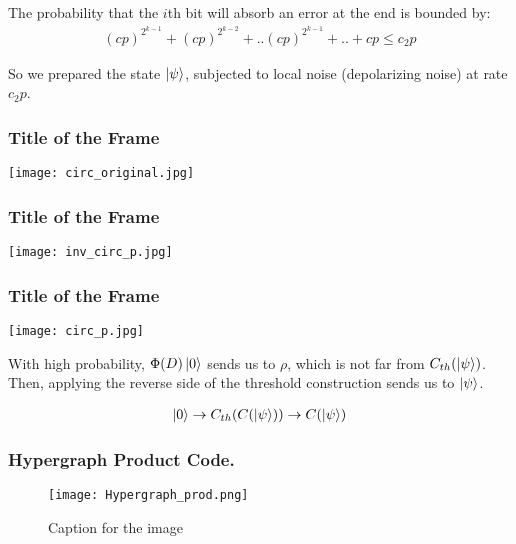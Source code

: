 \documentclass{beamer}
\begin{document}
\begin{frame}
The probability that the $i$th bit will absorb an error at the end is bounded by:
  \begin{equation*}
    \begin{split}
      \left( cp \right)^{2^{k-1}} + \left( cp \right)^{2^{k-2}} + .. \left( cp \right)^{2^{k-1}} + .. +  cp \le c_{2}p 
    \end{split}
  \end{equation*}
\end{frame}
So we prepared the state $\ket{\psi}$, subjected to local noise (depolarizing noise) at rate $c_{2}p$.

\begin{frame}
  \frametitle{Title of the Frame}
  \begin{center}
    \texttt{[image: circ\_original.jpg]}
  \end{center}
\end{frame}

\begin{frame}
  \frametitle{Title of the Frame}
  \begin{center}
    \texttt{[image: inv\_circ\_p.jpg]}
  \end{center}
\end{frame}

\begin{frame}
  \frametitle{Title of the Frame}
  \begin{center}
    \texttt{[image: circ\_p.jpg]}
  \end{center}
\end{frame}

\begin{frame}
With high probability, $\Phi(D)\ket{0}$ sends us to $\rho$, which is not far from $C_{th}(\ket{\psi})$. Then, applying the reverse side of the threshold construction sends us to $\ket{\psi}$.


\begin{equation*}
  \begin{split}
    \ket{0} \rightarrow C_{th} ( C (\ket{\psi} ) ) \rightarrow C (\ket{\psi} ) 
  \end{split}
\end{equation*}

\end{frame}

\begin{frame}
  \frametitle{Hypergraph Product Code.}
\begin{figure}[h]
    \centering
    \texttt{[image: Hypergraph\_prod.png]}
    \caption{Caption for the image}
    \label{fig:your-label}
\end{figure}

\end{frame}
\end{document}
